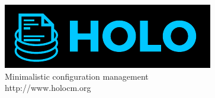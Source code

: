 \documentclass[aspectratio=169]{beamer}
\begin{document}
\begin{frame}[plain,c]
 \centering
 \includegraphics[width=\textwidth]{../32c3-lightning-talk/holo-logo.pdf}
 \\[1em]
 \LARGE Minimalistic configuration management
 \\[0.5em]
 \color{holoonblack} http://www.holocm.org
\end{frame}
\end{document}
